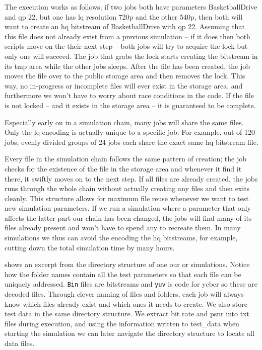 The execution works as follows; if two jobs both have parameters BasketballDrive and \gls{qp} 22, but one has \gls{lq} resolution 720p and the other 540p, then both will want to create an \gls{hq} bitstream of BasketballDrive with \gls{qp} 22. Assuming that this file does not already exist from a previous simulation -- if it does then both scripts move on the their next step -- both jobs will try to acquire the lock but only one will succeed. The job that grabs the lock starts creating the bitstream in its tmp area while the other jobs sleeps. After the file has been created, the job moves the file over to the public storage area and then removes the lock. This way, no in-progress or incomplete files will ever exist in the storage area, and furthermore we won't have to worry about race conditions in the code. If the file is not locked -- and it exists in the storage area -- it is guaranteed to be complete.

Especially early on in a simulation chain, many jobs will share the same files. Only the \gls{lq} encoding is actually unique to a specific job. For example, out of 120 jobs, evenly divided groups of 24 jobs each share the exact same \gls{hq} bitstream file.

Every file in the simulation chain follows the same pattern of creation; the job checks for the existence of the file in the storage area and whenever it find it there, it swiftly moves on to the next step. If all files are already created, the jobs runs through the whole chain without actually creating any files and then exits cleanly. This structure allows for maximum file reuse whenever we want to test new simulation parameters. If we run a simulation where a parameter that only affects the latter part our chain has been changed, the jobs will find many of its files already present and won't have to spend any to recreate them. In many simulations we thus can avoid the encoding the \gls{hq} bitstreams, for example, cutting down the total simulation time by many hours.



 shows an excerpt from the directory structure of one our or simulations. Notice how the folder names contain all the test parameters so that each file can be uniquely addressed. \texttt{Bin} files are bitstreams and \texttt{yuv} is code for \gls{ycbcr} so these are decoded files. Through clever naming of files and folders, each job will always know which files already exist and which ones it needs to create. We also store test data in the same directory structure. We extract bit rate and \gls{psnr} into txt files during execution, and using the information written to test{\_}data when starting the simulation we can later navigate the directory structure to locate all data files.

